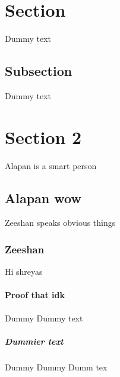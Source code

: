 \documentclass{article}
\begin{document}
\tableofcontents %
\newpage
{}

\section{Section}

Dummy text

\subsection{Subsection}

Dummy text

\section{Section 2}

Alapan is a smart person

\subsection{Alapan wow}

Zeeshan speaks obvious things

\subsubsection{Zeeshan}

Hi shreyas

\paragraph{Proof that idk}

Dummy Dummy text

\subparagraph{Dummier text}

Dummy Dummy Dumm tex
\end{document}
